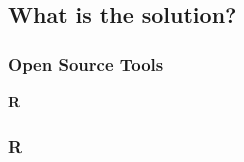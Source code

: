 \documentclass{beamer}
\begin{document}
\subsection{What is the solution?}

{
\begin{frame}[plain]
\frametitle{Open Source Tools}
\vspace{.3in}
\begin{center}
\Huge \textbf{R}
\end{center}
\end{frame}
}

{
\begin{frame}[plain]
\frametitle{R}
\end{frame}
}
\end{document}
